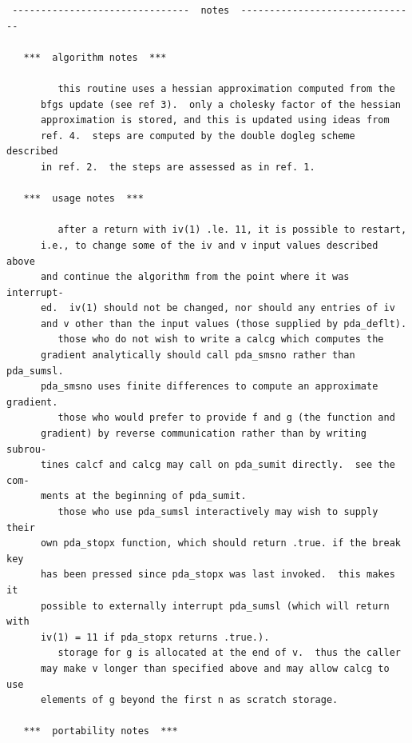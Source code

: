 \documentclass[11pt,twoside]{article}
\begin{document}
\begin{verbatim}
 -------------------------------  notes  -------------------------------

   ***  algorithm notes  ***

         this routine uses a hessian approximation computed from the
      bfgs update (see ref 3).  only a cholesky factor of the hessian
      approximation is stored, and this is updated using ideas from
      ref. 4.  steps are computed by the double dogleg scheme described
      in ref. 2.  the steps are assessed as in ref. 1.

   ***  usage notes  ***

         after a return with iv(1) .le. 11, it is possible to restart,
      i.e., to change some of the iv and v input values described above
      and continue the algorithm from the point where it was interrupt-
      ed.  iv(1) should not be changed, nor should any entries of iv
      and v other than the input values (those supplied by pda_deflt).
         those who do not wish to write a calcg which computes the
      gradient analytically should call pda_smsno rather than pda_sumsl.
      pda_smsno uses finite differences to compute an approximate gradient.
         those who would prefer to provide f and g (the function and
      gradient) by reverse communication rather than by writing subrou-
      tines calcf and calcg may call on pda_sumit directly.  see the com-
      ments at the beginning of pda_sumit.
         those who use pda_sumsl interactively may wish to supply their
      own pda_stopx function, which should return .true. if the break key
      has been pressed since pda_stopx was last invoked.  this makes it
      possible to externally interrupt pda_sumsl (which will return with
      iv(1) = 11 if pda_stopx returns .true.).
         storage for g is allocated at the end of v.  thus the caller
      may make v longer than specified above and may allow calcg to use
      elements of g beyond the first n as scratch storage.

   ***  portability notes  ***


\end{verbatim}
\end{document}

